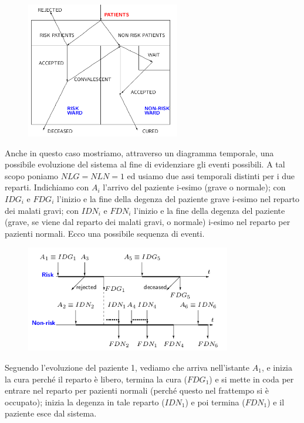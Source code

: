 \documentclass[11pt]{book}
\begin{document}
\begin{figure}[H]
  \centering
  \includegraphics[width=0.6\textwidth]{images/cap11fig13.png}
\end{figure}


Anche in questo caso mostriamo, attraverso un diagramma temporale, una
possibile evoluzione del sistema al fine di evidenziare gli eventi
possibili. A tal scopo poniamo $NLG=NLN=1$ ed usiamo due assi
temporali distinti per i due reparti. Indichiamo con $A_i$ l'arrivo
del paziente i-esimo (grave o normale); con $IDG_i$ e $FDG_i$ l'inizio
e la fine della degenza del paziente grave i-esimo nel reparto dei
malati gravi; con $IDN_i$ e $FDN_i$ l'inizio e la fine della degenza
del paziente (grave, se viene dal reparto dei malati gravi, o normale)
i-esimo nel reparto per pazienti normali. Ecco una possibile sequenza
di eventi.

\begin{figure}[H]
  \centering
  \includegraphics[width=0.8\textwidth]{images/cap11fig14.png}
\end{figure}

Seguendo l'evoluzione del paziente 1, vediamo che arriva nell'istante
$A_1$, e inizia la cura perch\'e il reparto \`e libero, termina la cura
($FDG_1$) e si mette in coda per entrare nel reparto per pazienti
normali (perch\'e questo nel frattempo si \`e occupato); inizia la
degenza in tale reparto ($IDN_1$) e poi termina ($FDN_1$) e il
paziente esce dal sistema.
\end{document}
